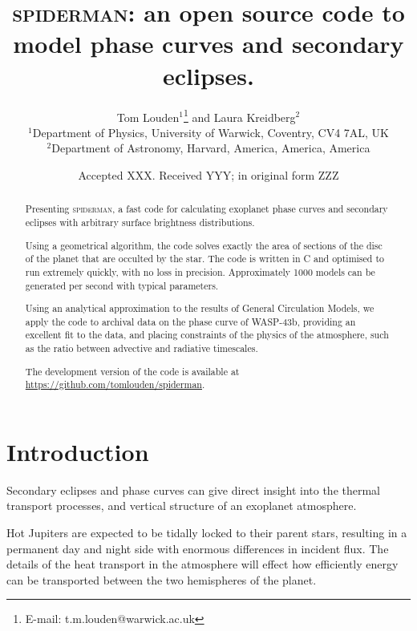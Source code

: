\documentclass[a4paper,fleqn,usenatbib]{mnras}
\title[spiderman]{\textsc{spiderman}: an open source code to model phase curves and secondary eclipses.}
\author[T. Louden, L. Kreidberg]{Tom Louden$^{1}$\thanks{E-mail: t.m.louden@warwick.ac.uk} and Laura Kreidberg$^{2}$\\
$^{1}$Department of Physics, University of Warwick, Coventry, CV4 7AL, UK\\
$^{2}$Department of Astronomy, Harvard, America, America, America}
\date{Accepted XXX. Received YYY; in original form ZZZ}
\begin{document}
\label{firstpage}
\pagerange{\pageref{firstpage}--\pageref{lastpage}}
\maketitle

\begin{abstract}

Presenting \textsc{spiderman}, a fast code for calculating exoplanet phase curves and secondary eclipses with arbitrary surface brightness distributions.

Using a geometrical algorithm, the code solves exactly the area of sections of the disc of the planet that are occulted by the star. The code is written in C and optimised to run extremely quickly, with no loss in precision. Approximately 1000 models can be generated per second with typical parameters.

Using an analytical approximation to the results of General Circulation Models, we apply the code to archival data on the phase curve of WASP-43b, providing an excellent fit to the data, and placing constraints of the physics of the atmosphere, such as the ratio between advective and radiative timescales.

The development version of the code is available at \url{https://github.com/tomlouden/spiderman}.

\end{abstract}

\begin{keywords}
\end{keywords}



\section{Introduction}\label{sec:introduction}

Secondary eclipses and phase curves can give direct insight into the thermal transport processes, and vertical structure of an exoplanet atmosphere.

Hot Jupiters are expected to be tidally locked to their parent stars, resulting in a permanent day and night side with enormous differences in incident flux. The details of the heat transport in the atmosphere will effect how efficiently energy can be transported between the two hemispheres of the planet.
\end{document}
